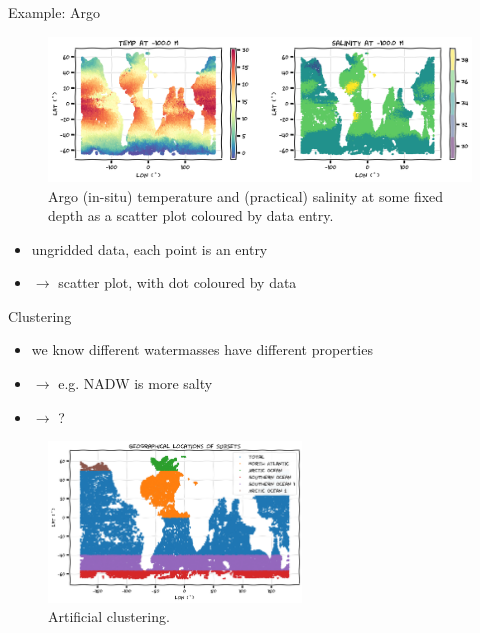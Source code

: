 \documentclass[xcolor=x11names,compress]{beamer}
\renewcommand{\(}{\begin{columns}}
\renewcommand{\)}{\end{columns}}
\newcommand{\<}[1]{\begin{column}{#1}}
\renewcommand{\>}{\end{column}}
\begin{document}

\begin{frame}{Example: Argo}

\begin{figure}
  \includegraphics[width=\textwidth]{argo_data_temp_sal}
  \caption{Argo (in-situ) temperature and (practical) salinity at some fixed
  depth as a scatter plot coloured by data entry.}
\end{figure}

\begin{itemize}
  \item ungridded data, each point is an entry
  \item[] $\to$ scatter plot, with dot coloured by data
\end{itemize}

\end{frame}


\begin{frame}{Clustering}

\begin{itemize}
  \item we know different watermasses have different properties
  \item[] $\to$ e.g. NADW is more salty
  \item[] $\to$ ?
\end{itemize}

\begin{figure}
  \includegraphics[width=0.6\textwidth]{argo_data_cluster}
  \caption{Artificial clustering.}
\end{figure}

\end{frame}
\end{document}
